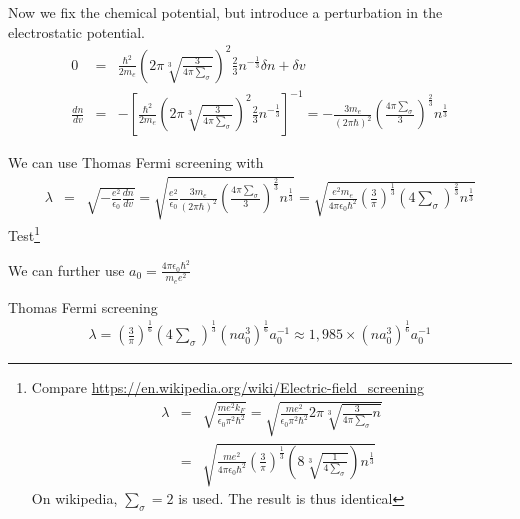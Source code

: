 \documentclass[11pt,a4paper]{report}
\begin{document}
Now we fix the chemical potential, but introduce a perturbation in the
electrostatic potential.
\begin{eqnarray}
0&=&\frac{\hbar^2}{2m_e}
\left(2\pi\sqrt[3]{\frac{3}{4\pi\sum_\sigma}}\right)^2
\frac{2}{3} n^{-\frac{1}{3}} \delta {n}
+\delta v
\nonumber\\
\frac{dn}{dv}&=&
-\left[\frac{\hbar^2}{2m_e}
\left(2\pi\sqrt[3]{\frac{3}{4\pi\sum_\sigma}}\right)^2
\frac{2}{3} n^{-\frac{1}{3}} \right]^{-1}
=-\frac{3m_e}{(2\pi\hbar)^2}
\left(\frac{4\pi\sum_\sigma}{3}\right)^{\frac{2}{3}} n^{\frac{1}{3}}
\end{eqnarray}



We can use Thomas Fermi screening with 
\begin{eqnarray}
\lambda
&=&\sqrt{-\frac{e^2}{\epsilon_0}\frac{dn}{dv}}
=\sqrt{\frac{e^2}{\epsilon_0}\frac{3m_e}{(2\pi\hbar)^2}
\left(\frac{4\pi\sum_\sigma}{3}\right)^{\frac{2}{3}} n^{\frac{1}{3}}}
=\sqrt{\frac{e^2m_e}{4\pi\epsilon_0\hbar^2}
\left(\frac{3}{\pi}\right)^{\frac{1}{3}}
\left(4\sum_\sigma\right)^{\frac{2}{3}} n^{\frac{1}{3}}}
\end{eqnarray}
Test\footnote{Compare
  \url{https://en.wikipedia.org/wiki/Electric-field_screening}
\begin{eqnarray}
\lambda&=&\sqrt{\frac{me^2k_F}{\epsilon_0\pi^2\hbar^2}}
=\sqrt{\frac{me^2}{\epsilon_0\pi^2\hbar^2}
2\pi\sqrt[3]{\frac{3}{4\pi\sum_\sigma}n}}
\nonumber\\
&=&\sqrt{\frac{me^2}{4\pi\epsilon_0\hbar^2}\left(\frac{3}{\pi}
\right)^{\frac{1}{3}}
\left(8\sqrt[3]{\frac{1}{4\sum_\sigma}}\right)
n^{\frac{1}{3}}
}
\end{eqnarray}
On wikipedia, $\sum_\sigma=2$ is used. The result is thus identical}

We can further use $a_0=\frac{4\pi\epsilon_0\hbar^2}{m_e e^2}$


\begin{myshadowminipage}{Thomas Fermi screening}
\begin{eqnarray}
\lambda=
\left(\frac{3}{\pi}\right)^{\frac{1}{6}}
\left(4\sum_\sigma\right)^{\frac{1}{3}}
\left(n a_0^3\right)^{\frac{1}{6}} a_0^{-1}
\approx 1,985\times\left(n a_0^3\right)^{\frac{1}{6}} a_0^{-1}
\end{eqnarray}
\end{myshadowminipage}
\end{document}
